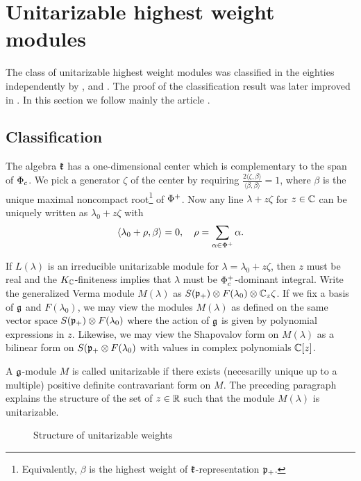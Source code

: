 \chapter{Unitarizable highest weight modules}

The class of unitarizable highest weight modules was classified in the eighties independently by \cite{jakobsen_hermitian_1983}, \cite{zuckermann} and \cite{enright_classification_1983}. The proof of the classification result was later improved in \cite{joseph_annihilators_1992}. In this section we follow mainly the article  \cite{enright_classification_1983}.

\section{Classification}

The algebra $\mathfrak{k}$ has a one-dimensional center which is complementary to the span of $\Phi_c$. We pick a generator $\zeta$ of the center by requiring $\frac{2 \langle \zeta,\beta \rangle}{\langle \beta, \beta \rangle} = 1$, where $\beta$ is the unique maximal noncompact root\footnote{Equivalently, $\beta$ is the highest weight of $\mathfrak{k}$-representation $\mathfrak{p}_+$.} of $\Phi^+$. Now any line $\lambda+z\zeta$ for $z\in\mathbb{C}$ can be uniquely written as $\lambda_0 + z\zeta$ with
\[
 \langle \lambda_0 + \rho,\beta \rangle = 0, \quad \rho =\sum_{\alpha\in\Phi^+} \alpha.
\]

If $L(\lambda)$ is an irreducible unitarizable module for $\lambda=\lambda_0+z\zeta$, then $z$ must be real and the $K_{\mathbb{C}}$-finiteness implies that $\lambda$ must be $\Phi^+_c$-dominant integral. Write the generalized Verma module $M(\lambda)$ as $S(\mathfrak{p}_+)\otimes F(\lambda_0) \otimes \mathbb{C}_z\zeta$. If we fix a basis of $\mathfrak{g}$ and $F(\lambda_0)$, we may view the modules $M(\lambda)$ as defined on the same vector space $S(\mathfrak{p}_+)\otimes F(\lambda_0)$ where the action of $\mathfrak{g}$ is given by polynomial expressions in $z$. Likewise, we may view the Shapovalov form on $M(\lambda)$ as a bilinear form on $S(\mathfrak{p}_+\otimes F(\lambda_0)$ with values in complex polynomials $\mathbb{C}[z]$.

A $\mathfrak{g}$-module $M$ is called unitarizable if there exists (necesarilly unique up to a multiple) positive definite contravariant form on $M$. The preceding paragraph explains the structure of the set of $z\in\mathbb{R}$ such that the module $M(\lambda)$ is unitarizable.

\begin{figure}[H]\label{fig:struct}
  \begin{center}
  \end{center}\caption{Structure of unitarizable weights} %
\end{figure}

